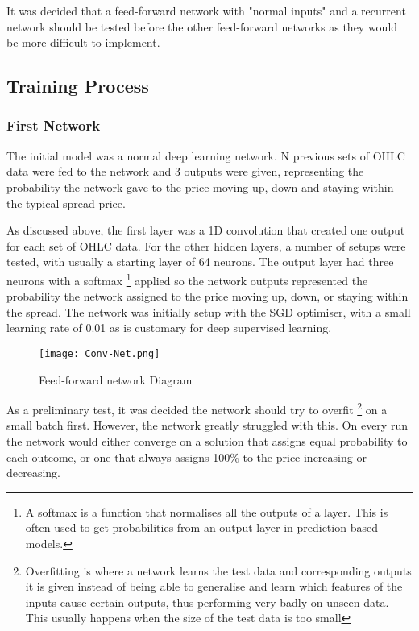         It was decided that a feed-forward network with "normal inputs" and a recurrent network should be tested before the other feed-forward networks as they would be more difficult to implement.


        \subsection{Training Process}

            \subsubsection{First Network}
            The initial model was a normal deep learning network. N previous sets of OHLC data were fed to the network and 3 outputs were given, representing the probability the network gave to the price moving up, down and staying within the typical spread price.

            As discussed above, the first layer was a 1D convolution that created one output for each set of OHLC data. For the other hidden layers, a number of setups were tested, with usually a starting layer of 64 neurons. The output layer had three neurons with a softmax \footnote{A softmax is a function that normalises all the outputs of a layer. This is often used to get probabilities from an output layer in prediction-based models.} applied so the network outputs represented the probability the network assigned to the price moving up, down, or staying within the spread. The network was initially setup with the SGD optimiser, with a small learning rate of 0.01 as is customary for deep supervised learning.
            
            \begin{figure}[htbp]
                \centering
                \texttt{[image: Conv-Net.png]}
                \caption{Feed-forward network Diagram}
                \label{fig:first_net_diagram}
            \end{figure}

            As a preliminary test, it was decided the network should try to overfit \footnote{Overfitting is where a network learns the test data and corresponding outputs it is given instead of being able to generalise and learn which features of the inputs cause certain outputs, thus performing very badly on unseen data. This usually happens when the size of the test data is too small} on a small batch first. However, the network greatly struggled with this. On every run the network would either converge on a solution that assigns equal probability to each outcome, or one that always assigns 100\% to the price increasing or decreasing.

